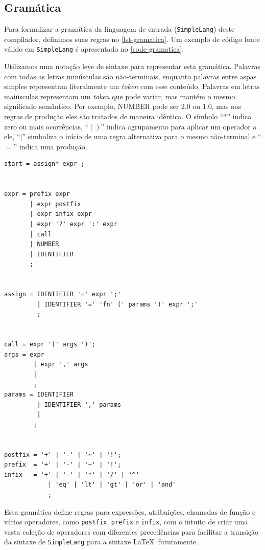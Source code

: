 \documentclass[english, 
               brazil, 
               bsc] %
               {dcomp-abntex2}
\begin{document}
\subsection{Gramática}

Para formalizar a gramática da linguagem de entrada (\texttt{SimpleLang}) deste compilador, definimos suas regras no \autoref{lst-gramatica}. Um exemplo de código fonte válido em \texttt{SimpleLang} é apresentado no \autoref{code-gramatica}.

Utilizamos uma notação leve de sintaxe para representar esta gramática. Palavras com todas as letras minúsculas são não-terminais, enquanto palavras entre aspas simples representam literalmente um \textit{token} com esse conteúdo. Palavras em letras maiúsculas representam um \textit{token} que pode variar, mas mantém o mesmo significado semântico. Por exemplo, NUMBER pode ser 2.0 ou 1.0, mas nas regras de produção eles são tratados de maneira idêntica. O símbolo ``$*$'' indica zero ou mais ocorrências, ``$()$'' indica agrupamento para aplicar um operador a ele, ``$|$'' simboliza o início de uma regra alternativa para o mesmo não-terminal e ``$=$'' indica uma produção.



\begin{lstlisting}[numbers=none, frame=none,caption=Gramática para \texttt{SimpleLang}.,label=lst-gramatica]
start = assign* expr ;


expr = prefix expr 
       | expr postfix  
       | expr infix expr 
       | expr '?' expr ':' expr
       | call
       | NUMBER
       | IDENTIFIER
       ;


assign = IDENTIFIER '=' expr ';'
         | IDENTIFIER '=' 'fn' (' params ')' expr ';'
         ; 


call = expr '(' args ')';
args = expr
        | expr ',' args
        | 
        ;
params = IDENTIFIER
         | IDENTIFIER ',' params
         | 
        ;


postfix = '+' | '-' | '~' | '!';
prefix  = '+' | '-' | '~' | '!';
infix   = '+' | '-' | '*' | '/' | '^'
            | 'eq' | 'lt' | 'gt' | 'or' | 'and'
            ;
\end{lstlisting}


Essa gramática define regras para expressões, atribuições, chamadas de função e vários operadores, como \texttt{postfix}, \texttt{prefix} e \texttt{infix}, com o intuito de criar uma vasta coleção de operadores com diferentes precedências para facilitar a transição da sintaxe de \texttt{SimpleLang} para a sintaxe \LaTeX\  futuramente.
\end{document}
